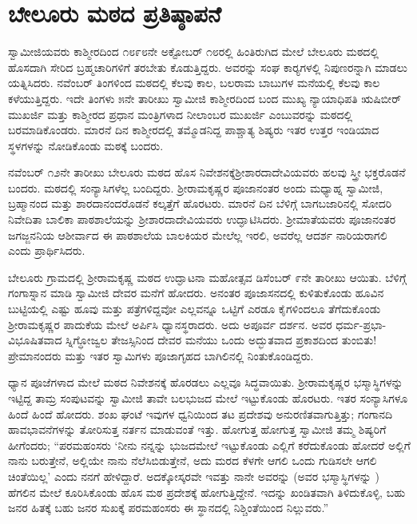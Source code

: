
\chapter{ಬೇಲೂರು ಮಠದ ಪ್ರತಿಷ್ಠಾಪನೆ}

 ಸ್ವಾಮೀಜಿಯವರು ಕಾಶ್ಮೀರದಿಂದ ೧೮೯೮ನೇ ಅಕ್ಟೋಬರ್ ೧೮ರಲ್ಲಿ ಹಿಂತಿರುಗಿದ ಮೇಲೆ ಬೇಲೂರು ಮಠದಲ್ಲಿ ಹೊಸದಾಗಿ ಸೇರಿದ ಬ್ರಹ್ಮಚಾರಿಗಳಿಗೆ ತರಬೇತು ಕೊಡುತ್ತಿದ್ದರು. ಅವರನ್ನು ಸಂಘ ಕಾರ‍್ಯಗಳಲ್ಲಿ ನಿಪುಣರನ್ನಾಗಿ ಮಾಡಲು ಯತ್ನಿಸಿದರು. ನವೆಂಬರ್ ತಿಂಗಳಿಂದ ಮಠದಲ್ಲಿ ಕೆಲವು ಕಾಲ, ಬಲರಾಮ ಬಾಬುಗಳ ಮನೆಯಲ್ಲಿ ಕೆಲವು ಕಾಲ ಕಳೆಯುತ್ತಿದ್ದರು. ಇದೇ ತಿಂಗಳು ೫ನೇ ತಾರೀಖು ಸ್ವಾಮೀಜಿ ಕಾಶ್ಮೀರದಿಂದ ಬಂದ ಮುಖ್ಯ ನ್ಯಾಯಾಧಿಪತಿ ಋಷಿಬೀರ್ ಮುಖರ್ಜಿ ಮತ್ತು ಕಾಶ್ಮೀರದ ಪ್ರಧಾನ ಮಂತ್ರಿಗಳಾದ ನೀಲಾಂಬರ ಮುಖರ್ಜಿ ಎಂಬುವರನ್ನು ಮಠದಲ್ಲಿ ಬರಮಾಡಿಕೊಂಡರು. ಮಾರನೆ ದಿನ ಕಾಶ್ಮೀರದಲ್ಲಿ ತಮ್ಮೊಡನಿದ್ದ ಪಾಶ್ಚಾತ್ಯ ಶಿಷ್ಯರು ಇತರ ಉತ್ತರ ಇಂಡಿಯಾದ ಸ್ಥಳಗಳನ್ನು ನೋಡಿಕೊಂಡು ಮಠಕ್ಕೆ ಬಂದರು. 

 ನವೆಂಬರ್ ೧೨ನೇ ತಾರೀಖು ಬೇಲೂರು ಮಠದ ಹೊಸ ನಿವೇಶನಕ್ಕೆ\break ಶ‍್ರೀಶಾರದಾದೇವಿಯವರು ಹಲವು ಸ್ತ್ರೀ ಭಕ್ತರೊಡನೆ ಬಂದರು. ಮಠದಲ್ಲಿ ಸಂನ್ಯಾಸಿಗಳೆಲ್ಲ ಬಂದಿದ್ದರು. ಶ‍್ರೀರಾಮಕೃಷ್ಣರ ಪೂಜಾನಂತರ ಅಂದು ಮಧ್ಯಾಹ್ನ ಸ್ವಾಮೀಜಿ, ಬ್ರಹ್ಮಾನಂದ ಮತ್ತು ಶಾರದಾನಂದರೊಡನೆ ಕಲ್ಕತ್ತೆಗೆ ಹೊರಟರು. ಮಾರನೆ ದಿನ ಬೆಳಿಗ್ಗೆ ಬಾಗಬಜಾರಿನಲ್ಲಿ ಸೋದರಿ ನಿವೇದಿತಾ ಬಾಲಿಕಾ ಪಾಠಶಾಲೆಯನ್ನು ಶ‍್ರೀಶಾರದಾದೇವಿ\-ಯವರು ಉದ್ಘಾಟಿಸಿದರು. ಶ‍್ರೀಮಾತೆಯವರು ಪೂಜಾನಂತರ ಜಗಜ್ಜನನಿಯ ಆಶೀರ್ವಾದ ಈ ಪಾಠಶಾಲೆಯ ಬಾಲಕಿಯರ ಮೇಲೆಲ್ಲ ಇರಲಿ, ಅವರೆಲ್ಲ ಆದರ್ಶ ನಾರಿಯರಾಗಲಿ ಎಂದು ಪ್ರಾರ್ಥಿಸಿದರು. 

 ಬೇಲೂರು ಗ್ರಾಮದಲ್ಲಿ ಶ‍್ರೀರಾಮಕೃಷ್ಣ ಮಠದ ಉದ್ಘಾಟನಾ ಮಹೋತ್ಸವ ಡಿಸೆಂಬರ್ ೯ನೇ ತಾರೀಖು ಆಯಿತು. ಬೆಳಿಗ್ಗೆ ಗಂಗಾಸ್ನಾನ ಮಾಡಿ ಸ್ವಾಮೀಜಿ ದೇವರ ಮನೆಗೆ ಹೋದರು. ಅನಂತರ ಪೂಜಾಸನದಲ್ಲಿ ಕುಳಿತುಕೊಂಡು ಹೂವಿನ ಬುಟ್ಟಿಯಲ್ಲಿ ಎಷ್ಟು ಹೂವು ಮತ್ತು ಪತ್ರೆಗಳಿದ್ದವೋ ಎಲ್ಲವನ್ನೂ ಒಟ್ಟಿಗೆ ಎರಡೂ ಕೈಗಳಿಂದಲೂ ತೆಗೆದುಕೊಂಡು ಶ‍್ರೀರಾಮಕೃಷ್ಣರ ಪಾದುಕೆಯ ಮೇಲೆ ಅರ್ಪಿಸಿ ಧ್ಯಾನಸ್ಥರಾದರು. ಅದು ಅಪೂರ್ವ ದರ್ಶನ. ಅವರ ಧರ್ಮ-ಪ್ರಭಾ-ವಿಭೂಷಿತವಾದ ಸ್ನಿಗ್ಧೋಜ್ವಲ ತೇಜಸ್ಸಿನಿಂದ ದೇವರ ಮನೆಯು ಒಂದು ಅದ್ಭುತವಾದ ಪ್ರಕಾಶದಿಂದ ತುಂಬಿತು! ಪ್ರೇಮಾನಂದರು ಮತ್ತು ಇತರ ಸ್ವಾಮಿಗಳು ಪೂಜಾಗೃಹದ ಬಾಗಿಲಿನಲ್ಲಿ ನಿಂತುಕೊಂಡಿದ್ದರು. 

 ಧ್ಯಾನ ಪೂಜೆಗಳಾದ ಮೇಲೆ ಮಠದ ನಿವೇಶನಕ್ಕೆ ಹೊರಡಲು ಎಲ್ಲವೂ ಸಿದ್ಧವಾಯಿತು. ಶ‍್ರೀರಾಮಕೃಷ್ಣರ ಭಸ್ಮಾಸ್ಥಿಗಳನ್ನು ಇಟ್ಟಿದ್ದ ತಾಮ್ರ ಸಂಪುಟವನ್ನು ಸ್ವಾಮೀಜಿ ತಾವೇ ಬಲಭುಜದ ಮೇಲೆ ಇಟ್ಟುಕೊಂಡು ಹೊರಟರು. ಇತರ ಸಂನ್ಯಾಸಿಗಳೂ ಹಿಂದೆ ಹಿಂದೆ ಹೋದರು. ಶಂಖ ಘಂಟೆ ಇವುಗಳ ಧ್ವನಿಯಿಂದ ತಟ ಪ್ರದೇಶವು ಅನುರಣಿತವಾಗುತ್ತಿತ್ತು; ಗಂಗಾನದಿ ಹಾವಭಾವನೆಗಳನ್ನು ತೋರಿಸುತ್ತ ನರ್ತನ ಮಾಡುವಂತೆ ಇತ್ತು. ಹೋಗುತ್ತ ಹೋಗುತ್ತ ಸ್ವಾಮೀಜಿ ತಮ್ಮ ಶಿಷ್ಯರಿಗೆ ಹೀಗೆಂದರು; “ಪರಮಹಂಸರು ‘ನೀನು ನನ್ನನ್ನು ಭುಜದಮೇಲೆ ಇಟ್ಟುಕೊಂಡು ಎಲ್ಲಿಗೆ ಕರೆದುಕೊಂಡು ಹೋದರೆ ಅಲ್ಲಿಗೆ ನಾನು ಬರುತ್ತೇನೆ, ಅಲ್ಲಿಯೇ ನಾನು ನೆಲೆಸಿಬಿಡುತ್ತೇನೆ, ಅದು ಮರದ ಕೆಳಗೇ ಆಗಲಿ ಒಂದು ಗುಡಿಸಲೇ ಆಗಲಿ ಚಿಂತೆಯಿಲ್ಲ’ ಎಂದು ನನಗೆ ಹೇಳಿದ್ದಾರೆ. ಅದಕ್ಕೋಸ್ಕರವೇ ಇವತ್ತು ನಾನೇ ಅವರನ್ನು (ಅವರ ಭಸ್ಮಾಸ್ಥಿಗಳನ್ನು ) ಹೆಗಲಿನ ಮೇಲೆ ಕೂರಿಸಿಕೊಂಡು ಹೊಸ ಮಠ ಪ್ರದೇಶಕ್ಕೆ ಹೋಗುತ್ತಿದ್ದೇನೆ. ಇದನ್ನು ಖಂಡಿತವಾಗಿ ತಿಳಿದುಕೊಳ್ಳಿ, ಬಹು ಜನರ ಹಿತಕ್ಕೆ ಬಹು ಜನರ ಸುಖಕ್ಕೆ ಪರಮಹಂಸರು ಈ ಸ್ಥಾನದಲ್ಲಿ ನಿಶ್ಚಿಂತೆಯಿಂದ ನಿಲ್ಲುವರು.” 

